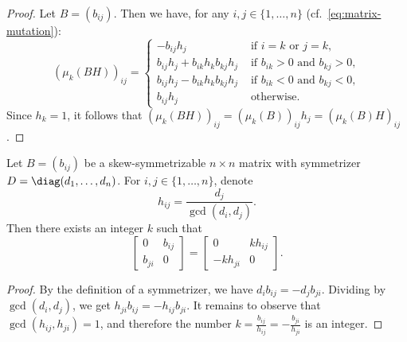 \begin{proof}
Let $B=(b_{ij})$. Then we have, for any $i,j\in\{1,\dots,n\}$ (cf.~\eqref{eq:matrix-mutation}): 
\[
(\mu_k(BH))_{ij}=\begin{cases} -b_{ij}h_j &\text{ if }i=k\text{ or }j=k, \\
b_{ij}h_j+b_{ik}h_k b_{kj} h_j &\text{ if }b_{ik}>0\text{ and }b_{kj}>0,\\
b_{ij}h_j-b_{ik}h_k b_{kj} h_j&\text{ if }b_{ik}<0\text{ and }b_{kj}<0,\\ 
b_{ij}h_j &\text{ otherwise.} 
\end{cases}
\] 
Since $h_k=1$, it follows that $(\mu_k(BH))_{ij}=(\mu_k(B))_{ij}h_j=(\mu_k(B)H)_{ij}$. 
\end{proof}


\begin{lemma}
\label{lem:bij-divisible}
Let $B=(b_{ij})$ be a skew-symmetrizable $n\times n$ matrix with symmetrizer $D=\diag (d_1,\dots,d_n)$. 
For $i,j\in\{1,\dots,n\}$, denote
\begin{equation}
\label{eq:hij}
h_{ij}=\frac{d_j}{\gcd(d_i,d_j)} .
\end{equation}
Then %
there exists an integer $k$ such that 
\[
\begin{bmatrix}
0 & b_{ij} \\
b_{ji} & 0
\end{bmatrix}
= \begin{bmatrix}
0 & kh_{ij} \\
-kh_{ji} & 0
\end{bmatrix} .
\]
\end{lemma}

\begin{proof}
By the definition of a symmetrizer, we have $d_i b_{ij}=-d_j b_{ji}$. Dividing by $\gcd(d_i,d_j)$, we get $h_{ji} b_{ij}=-h_{ij} b_{ji}$.
It remains to observe that $\gcd(h_{ij},h_{ji})=1$, and therefore the number 
$k=\frac{b_{ij}}{h_{ij}}=-\frac{b_{ji}}{h_{ji}}$ 
 is an integer. 
\end{proof}


